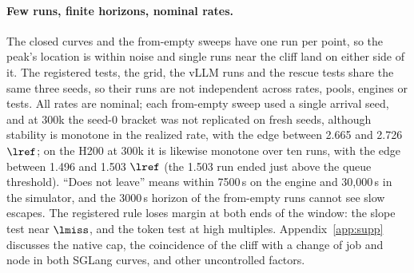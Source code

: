 \paragraph{Few runs, finite horizons, nominal rates.} The closed curves and the from-empty sweeps have one run per point, so the peak's location is within noise and single runs near the cliff land on either side of it. The registered tests, the grid, the vLLM runs and the rescue tests share the same three seeds, so their runs are not independent across rates, pools, engines or tests. All rates are nominal; each from-empty sweep used a single arrival seed, and at 300k the seed-0 bracket was not replicated on fresh seeds, although stability is monotone in the realized rate, with the edge between 2.665 and 2.726 $\lref$; on the H200 at 300k it is likewise monotone over ten runs, with the edge between 1.496 and 1.503 $\lref$ (the 1.503 run ended just above the queue threshold). ``Does not leave'' means within 7500\,s on the engine and 30,000\,s in the simulator, and the 3000\,s horizon of the from-empty runs cannot see slow escapes. The registered rule loses margin at both ends of the window: the slope test near $\lmiss$, and the token test at high multiples. Appendix~\ref{app:supp} discusses the native cap, the coincidence of the cliff with a change of job and node in both SGLang curves, and other uncontrolled factors.

